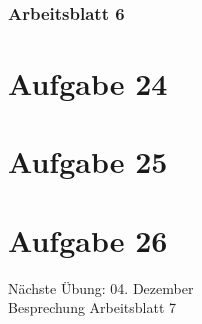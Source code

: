 \documentclass[9pt,german]{beamer}%
\begin{document}
\maketitle%
\addtocounter{framenumber}{-1}%

\begin{frame}
  \frametitle{Arbeitsblatt 6}%
\tableofcontents
\end{frame}
\setcounter{exercise}{23}

\section{Aufgabe 24}

\section{Aufgabe 25}

\section{Aufgabe 26}



\begin{frame}
\centering
\Huge{}
\vspace{2cm}

{\LARGE
N\"achste \"Ubung: 04. Dezember\\
Besprechung Arbeitsblatt 7
}
\end{frame}


\end{document}
